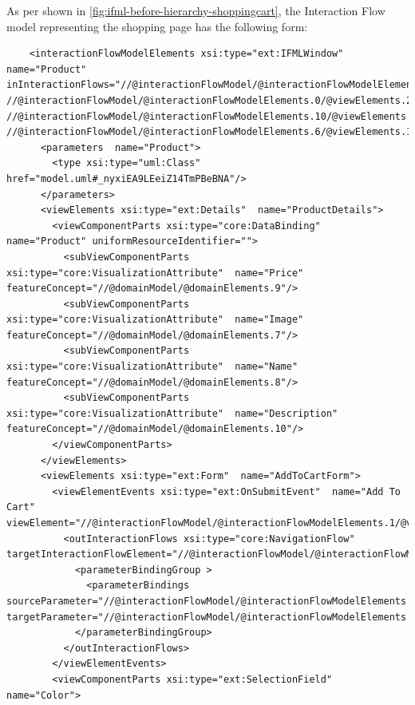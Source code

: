 \newpage
As per shown in \ref{fig:ifml-before-hierarchy-shoppingcart}, the Interaction Flow model representing the shopping page has the following form:

\lstset{language=XML}
\begin{lstlisting} 
    <interactionFlowModelElements xsi:type="ext:IFMLWindow"  name="Product" inInteractionFlows="//@interactionFlowModel/@interactionFlowModelElements.1/@viewElements.2/@viewElementEvents.0/@outInteractionFlows.0 //@interactionFlowModel/@interactionFlowModelElements.0/@viewElements.2/@viewElementEvents.0/@outInteractionFlows.0 //@interactionFlowModel/@interactionFlowModelElements.10/@viewElements.0/@viewElementEvents.0/@outInteractionFlows.0 //@interactionFlowModel/@interactionFlowModelElements.6/@viewElements.1/@viewElements.0/@viewElementEvents.0/@outInteractionFlows.0">
      <parameters  name="Product">
        <type xsi:type="uml:Class" href="model.uml#_nyxiEA9LEeiZ14TmPBeBNA"/>
      </parameters>
      <viewElements xsi:type="ext:Details"  name="ProductDetails">
        <viewComponentParts xsi:type="core:DataBinding"  name="Product" uniformResourceIdentifier="">
          <subViewComponentParts xsi:type="core:VisualizationAttribute"  name="Price" featureConcept="//@domainModel/@domainElements.9"/>
          <subViewComponentParts xsi:type="core:VisualizationAttribute"  name="Image" featureConcept="//@domainModel/@domainElements.7"/>
          <subViewComponentParts xsi:type="core:VisualizationAttribute"  name="Name" featureConcept="//@domainModel/@domainElements.8"/>
          <subViewComponentParts xsi:type="core:VisualizationAttribute"  name="Description" featureConcept="//@domainModel/@domainElements.10"/>
        </viewComponentParts>
      </viewElements>
      <viewElements xsi:type="ext:Form"  name="AddToCartForm">
        <viewElementEvents xsi:type="ext:OnSubmitEvent"  name="Add To Cart" viewElement="//@interactionFlowModel/@interactionFlowModelElements.1/@viewElements.1">
          <outInteractionFlows xsi:type="core:NavigationFlow"  targetInteractionFlowElement="//@interactionFlowModel/@interactionFlowModelElements.9">
            <parameterBindingGroup >
              <parameterBindings  sourceParameter="//@interactionFlowModel/@interactionFlowModelElements.1/@viewElements.1/@viewComponentParts.2" targetParameter="//@interactionFlowModel/@interactionFlowModelElements.1/@viewElements.1/@viewComponentParts.2"/>
            </parameterBindingGroup>
          </outInteractionFlows>
        </viewElementEvents>
        <viewComponentParts xsi:type="ext:SelectionField"  name="Color">

\end{lstlisting}
